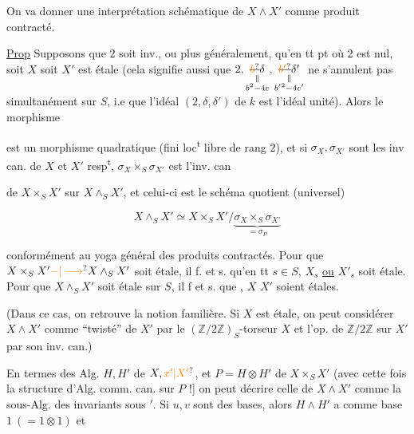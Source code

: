  On va donner une interprétation
schématique de $X\wedge X'$ comme produit
contracté.

\uline{Prop} Supposons que 2 soit inv., ou
plus généralement, qu'en tt pt où 2 est nul,
soit $X$ soit $X'$ est étale (cela signifie
aussi que $2,\underset{\substack{\parallel\\ b^2-4c}}{\deleted{\unsure{b}}\delta},\underset{\substack{\parallel\\ b'{}^2-4c'}}{\deleted{\unsure{b'}}\delta'}$ ne s'annulent pas
simultanément sur $S$, i.e que
l'idéal $(2,\delta,\delta')$ de $k$ est l'idéal unité).
Alors le  morphisme


est  un morphisme quadratique
(fini loc\textsuperscript{t} libre de rang 2), et si $\sigma_X,\sigma_{X'}$ sont
les inv can. de $X$ et $X'$ resp\textsuperscript{t}, $\sigma_X\times_S\sigma_{X'}$ est l'inv. can


de $X\times_S X'$ sur $X\wedge_S X'$, et celui-ci est
le  schéma quotient (universel)

\[
X\wedge_S X'\simeq X\times_S X'\big/\underbrace{\sigma_X\times_S\sigma_{X'}}_{=\sigma_P}
\]

conformément au yoga général des
produits contractés. Pour que
$X\times_S X'\unsure{-|\longrightarrow}X\wedge_S X'$ soit étale, il f. et s. qu'en
tt $s\in S$, $X_s$ \uline{ou} $X'_s$ soit étale. Pour
que $X\wedge_S X'$ soit étale sur $S$, il f et s.
que , $X$  $X'$ soient étales.

(Dans ce cas, on retrouve la notion familière.
Si $X$  est étale, on peut considérer
$X\wedge X'$ comme ``twisté'' de $X'$ par le
$(\mathbb Z/2\mathbb Z)_S$-torseur $X$ et l'op. de $\mathbb Z/2\mathbb Z$ sur $X'$
par son inv. can.)

En termes des Alg. $H,H'$ de $X,\unsure{x'|X'}$,
et $P=H\otimes H'$ de $X\times_S X'$ (avec cette fois
la structure d'Alg. comm. can. sur $P$ !]
on peut décrire celle de $X\wedge X'$ comme
la sous-Alg.  des invariants sous $'$.
Si $u,v$ sont des bases, alors $H\wedge H'$
a comme base $1\ (=1\otimes 1)$ et

